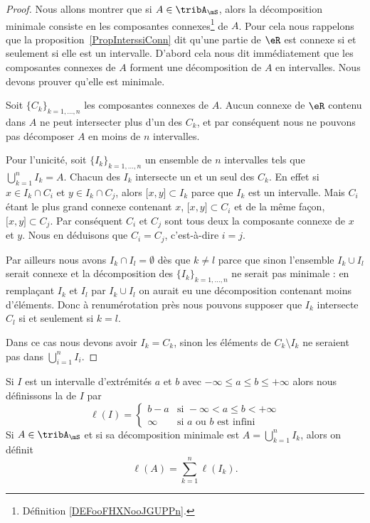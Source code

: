 \begin{proof}
	Nous allons montrer que si \( A\in\tribA_{\mS}\), alors la décomposition minimale consiste en les composantes connexes\footnote{Définition \ref{DEFooFHXNooJGUPPn}.} de \( A\). Pour cela nous rappelons que la proposition~\ref{PropInterssiConn} dit qu'une partie de \( \eR\) est connexe si et seulement si elle est un intervalle. D'abord cela nous dit immédiatement que les composantes connexes de \( A\) forment une décomposition de \( A\) en intervalles. Nous devons prouver qu'elle est minimale.

	Soit \( \{ C_k \}_{k=1,\ldots, n}\) les composantes connexes de \( A\). Aucun connexe de \( \eR\) contenu dans \( A\) ne peut intersecter plus d'un des \( C_k\), et par conséquent nous ne pouvons pas décomposer \( A\) en moins de \( n\) intervalles.

	Pour l'unicité, soit \( \{ I_k \}_{k=1,\ldots, n}\) un ensemble de \( n\) intervalles tels que \( \bigcup_{k=1}^nI_k=A\). Chacun des \( I_k\) intersecte un et un seul des \( C_k\). En effet si \( x\in I_k\cap C_i\) et \( y\in I_k\cap C_j\), alors \( \mathopen[ x , y \mathclose]\subset I_k\) parce que \( I_k\) est un intervalle. Mais \( C_i\) étant le plus grand connexe contenant \( x\), \( \mathopen[ x , y \mathclose]\subset C_i\) et de la même façon, \( \mathopen[ x , y \mathclose]\subset C_j\). Par conséquent \( C_i\) et \( C_j\) sont tous deux la composante connexe de \( x\) et \( y\). Nous en déduisons que \( C_i=C_j\), c'est-à-dire \( i=j\).

	Par ailleurs nous avons \( I_k\cap I_l=\emptyset\) dès que \( k\neq l\) parce que sinon l'ensemble \( I_k\cup I_l\) serait connexe et la décomposition des \( \{ I_k \}_{k=1,\ldots, n} \) ne serait pas minimale : en remplaçant \( I_k\) et \( I_l\) par \( I_k\cup I_l\) on aurait eu une décomposition contenant moins d'éléments. Donc à renumérotation près nous pouvons supposer que \( I_k\) intersecte \( C_l\) si et seulement si \( k=l\).

	Dans ce cas nous devons avoir \( I_k=C_k\), sinon les éléments de \( C_k\setminus I_k\) ne seraient pas dans \( \bigcup_{i=1}^nI_i\).
\end{proof}

\begin{definition}
	Si \( I\) est un intervalle d'extrémités \( a\) et \( b\) avec \( -\infty\leq a\leq b\leq +\infty\) alors nous définissons la  de \( I\) par
	\begin{equation}
		\ell(I)=\begin{cases}
			b-a    & \text{si } -\infty<a\leq b< +\infty         \\
			\infty & \text{si } a\text{ ou } b\text{ est infini}
		\end{cases}
	\end{equation}
	Si \( A\in\tribA_{\mS}\) et si sa décomposition minimale est \( A=\bigcup_{k=1}^nI_k\), alors on définit
	\begin{equation}
		\ell(A)=\sum_{k=1}^n\ell(I_k).
	\end{equation}
\end{definition}

